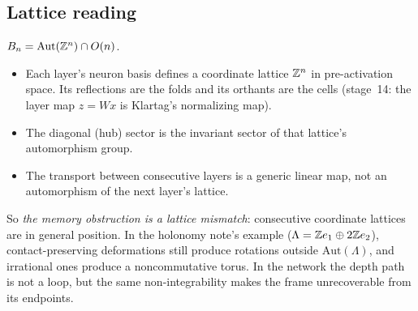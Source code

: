 \subsection{Lattice reading}
$B_n=\mathrm{Aut}(\mathbb Z^n)\cap O(n)$.
\begin{itemize}[leftmargin=*]
\item Each layer's neuron basis defines a coordinate lattice $\mathbb Z^n$ in pre-activation space. Its reflections are the folds and its
orthants are the cells (stage~14: the layer map $z=Wx$ is Klartag's normalizing map).
\item The diagonal (hub) sector is the invariant sector of that lattice's automorphism group.
\item The transport between consecutive layers is a generic linear map, not an automorphism of the next layer's lattice.
\end{itemize}
So \emph{the memory obstruction is a lattice mismatch}: consecutive coordinate lattices are in general position. In the holonomy note's
example ($\Lambda=\mathbb Z e_1\oplus2\mathbb Z e_2$), contact-preserving deformations still produce rotations outside $\mathrm{Aut}(\Lambda)$, and irrational ones
produce a noncommutative torus. In the network the depth path is not a loop, but the same non-integrability makes the frame
unrecoverable from its endpoints.
